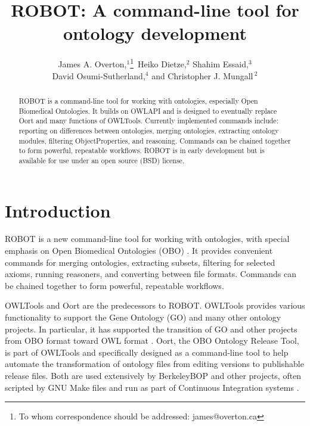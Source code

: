 \documentclass{icbo}
\begin{document}
\title[ROBOT]{ROBOT: A command-line tool for ontology development}
\author[Overton \textit{et~al}]{
James A. Overton,$^{1}$\footnote{To whom correspondence should be addressed: james@overton.ca}\,
Heiko Dietze,$^{2}$
Shahim Essaid,$^{3}$\\
David Osumi-Sutherland,$^{4}$
and Christopher J. Mungall\,$^{2}$}
\address{$^{1}$Knocean, Toronto, Ontario, Canada\\
$^{2}$Lawrence Berkeley National Laboratory, Berkeley, California, USA\\
$^{3}$Oregon Health and Science University Library, Portland, Oregon, USA\\
$^{4}$European Molecular Biology Laboratory -- European Bioinformatics Institute,\\Wellcome Trust Genome Campus, Hinxton, United Kingdom}

\maketitle

\begin{abstract}
ROBOT is a command-line tool for working with ontologies, especially Open Biomedical Ontologies. It builds on OWLAPI and is designed to eventually replace Oort and many functions of OWLTools. Currently implemented commands include: reporting on differences between ontologies, merging ontologies, extracting ontology modules, filtering ObjectProperties, and reasoning. Commands can be chained together to form powerful, repeatable workflows. ROBOT is in early development but is available for use under an open source (BSD) license.
\end{abstract}

\section{Introduction}

ROBOT is a new command-line tool for working with ontologies, with special emphasis on Open Biomedical Ontologies (OBO) \citep{Smith2007}. It provides convenient commands for merging ontologies, extracting subsets, filtering for selected axioms, running reasoners, and converting between file formats. Commands can be chained together to form powerful, repeatable workflows.

OWLTools and Oort are the predecessors to ROBOT. OWLTools provides various functionality to support the Gene Ontology (GO) and many other ontology projects. In particular, it has supported the transition of GO and other projects from OBO format toward OWL format \citep{Mungall2014}. Oort, the OBO Ontology Release Tool, is part of OWLTools and specifically designed as a command-line tool to help automate the transformation of ontology files from editing versions to publishable release files. Both are used extensively by BerkeleyBOP and other projects, often scripted by GNU Make files and run as part of Continuous Integration systems \citep{Mungall2012}.
\end{document}
